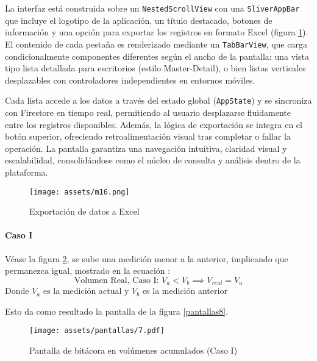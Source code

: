 La interfaz está construida sobre un \texttt{NestedScrollView} con una \texttt{SliverAppBar} que incluye el logotipo de la aplicación, un título destacado, botones de información y una opción para exportar los registros en formato Excel (figura \ref{pantallas15}). El contenido de cada pestaña es renderizado mediante un \texttt{TabBarView}, que carga condicionalmente componentes diferentes según el ancho de la pantalla: una vista tipo lista detallada para escritorios (estilo Master-Detail), o bien listas verticales desplazables con controladores independientes en entornos móviles.

Cada lista accede a los datos a través del estado global (\texttt{AppState}) y se sincroniza con Firestore en tiempo real, permitiendo al usuario desplazarse fluidamente entre los registros disponibles. Además, la lógica de exportación se integra en el botón superior, ofreciendo retroalimentación visual tras completar o fallar la operación. La pantalla garantiza una navegación intuitiva, claridad visual y escalabilidad, consolidándose como el núcleo de consulta y análisis dentro de la plataforma. 

\begin{figure}[h!]
\centering
  \texttt{[image: assets/m16.png]}
  \caption{Exportación de datos a Excel}
  \label{pantallas15}
\end{figure}


\paragraph{Caso I}

Véase la figura \ref{pantallas7}, se sube una medición menor a la anterior, implicando que permanezca igual, mostrado en la ecuación :
\begin{equation}
\text{Volumen Real, Caso I: } V_{a}<V_{b}\implies  V_{real} = V_{a}
\label{eq1}
\end{equation}
Donde $V_{a}$ es la medición actual y $V_{b}$ es la medición anterior

Esto da como resultado la pantalla de la figura \ref{pantallas8}.

\begin{figure}[h!]
\centering
  \texttt{[image: assets/pantallas/7.pdf]}
  \caption{Pantalla de bitácora en volúmenes acumulados (Caso I)}
  \label{pantallas7}
\end{figure}


